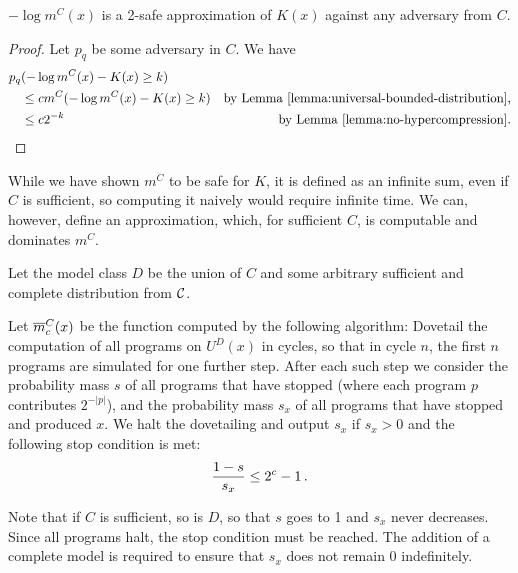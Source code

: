 
\renewcommand*{\thefootnote}{\arabic{footnote}}

\begin{theorem}
$-\log m^C(x)$ is a 2-safe approximation of $K(x)$ against any adversary from $C$.
\label{theorem:safe}
\end{theorem}
\begin{proof}\belowdisplayskip=-12pt
Let $p_q$ be some adversary in $C$. We have 
\begin{align*}
p_q&(-\log m^C(x) - K(x) \geq k) \\ 
&\leq c m^C(-\log m^C(x) - K(x) \geq k) &\text{by Lemma~\ref{lemma:universal-bounded-distribution},} \\
&\leq c 2^{-k} &\text{by Lemma~\ref{lemma:no-hypercompression}.}
\end{align*}
\end{proof}
While we have shown $m^C$ to be safe for $K$, it is defined as an infinite sum, even if $C$ is sufficient, so computing it naively would require infinite time. We can, however, define an approximation, which, for sufficient $C$, is computable and dominates $m^C$.

\begin{definition}
\label{definition:algorithm}
Let the model class $D$ be the union of $C$ and some arbitrary sufficient and complete distribution from ${\cal C}$.

Let ${\overline{m}}^C_c(x)$ be the function computed by the following algorithm:
Dovetail the computation of all programs on $U^D(x)$ in cycles, so that in cycle $n$, the first $n$ programs are simulated for one further step. After each such step we consider the probability mass $s$ of all programs that have stopped (where each program $p$ contributes $2^{-|p|}$), and the probability mass $s_x$ of all programs that have stopped and produced $x$. We halt the dovetailing and output $s_x$ if $s_x > 0$ and the following stop condition is met:
\[
\frac{1-s}{s_x} \leq 2^c - 1 \,\text{.}
\] 
\end{definition}
Note that if $C$ is sufficient, so is $D$, so that $s$ goes to 1 and $s_x$ never decreases.  Since all programs halt, the stop condition must be reached. The addition of a complete model is required to ensure that $s_x$ does not remain $0$ indefinitely.

